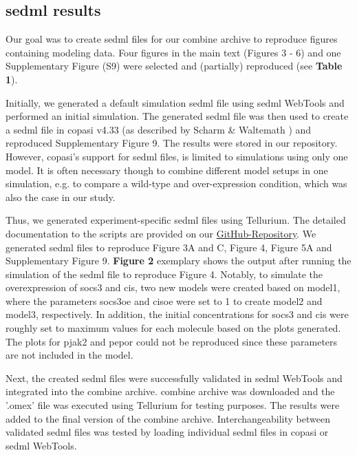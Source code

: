 \subsection*{\acf{sedml} results}

Our goal was to create \ac{sedml} files for our \acs{combine} archive to reproduce figures containing modeling data. Four figures in the main text (Figures 3 - 6) and one Supplementary Figure (S9) were selected and (partially) reproduced (see \textbf{Table 1}).

Initially, we generated a default simulation \ac{sedml} file using \ac{sedml} WebTools and performed an initial simulation. The generated \ac{sedml} file was then used to create a \ac{sedml} file in \ac{copasi} v4.33 (as described by Scharm \& Waltemath \cite{combine}) and reproduced Supplementary Figure 9. The results were stored in our repository. However, \ac{copasi}'s support for \ac{sedml} files, is limited to simulations using only one model. It is often necessary though to combine different model setups in one simulation, e.g. to compare a wild-type and over-expression condition, which was also the case in our study.

Thus, we generated experiment-specific \ac{sedml} files using Tellurium. The detailed documentation to the scripts are provided on our \hyperlink{https://github.com/ahodelin/Bachmann_Archive/wiki/SEDML_Tellurium}{GitHub-Repository}. We generated \ac{sedml} files to reproduce Figure 3A and C, Figure 4, Figure 5A and Supplementary Figure 9. \textbf{Figure 2} exemplary shows the output after running the simulation of the \ac{sedml} file to reproduce Figure 4. Notably, to simulate the overexpression of \acs{socs}3 and \ac{cis}, two new models were created based on model1, where the parameters \acs{socs}3oe and \acs{cis}oe were set to 1 to create model2 and model3, respectively. In addition, the initial concentrations for \ac{socs}3 and \ac{cis} were roughly set to maximum values for each molecule based on the plots generated. The plots for \acs{pjak}2 and \acs{pepor} could not be reproduced since these parameters are not included in the model.

Next, the created \ac{sedml} files were successfully validated in \ac{sedml} WebTools and integrated into the \ac{combine} archive. \ac{combine} archive was downloaded and the '.omex' file was executed using Tellurium for testing purposes. The results were added to the final version of the \ac{combine} archive. Interchangeability between validated \ac{sedml} files was tested by loading individual \ac{sedml} files in \ac{copasi} or \ac{sedml} WebTools. 

